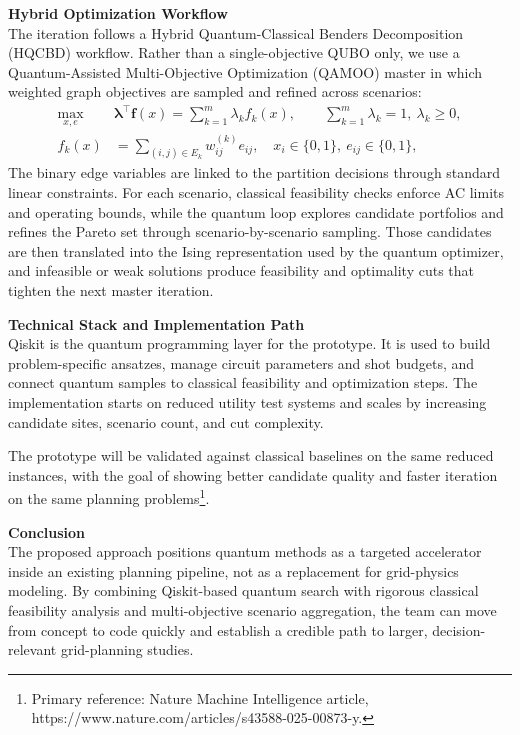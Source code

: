 \documentclass[11pt]{article}
\begin{document}
\noindent\textbf{Hybrid Optimization Workflow}\\
The iteration follows a Hybrid Quantum-Classical Benders Decomposition (HQCBD) workflow. Rather than a single-objective QUBO only, we use a Quantum-Assisted Multi-Objective Optimization (QAMOO) master in which weighted graph objectives are sampled and refined across scenarios:
\begin{align*}
\max_{x,e}\quad & \mathbf{\lambda}^{\top}\mathbf{f}(x) = \sum_{k=1}^{m} \lambda_k f_k(x),
\qquad \sum_{k=1}^{m}\lambda_k = 1,\ \lambda_k\ge 0, \\
f_k(x) &= \sum_{(i,j)\in E_k} w_{ij}^{(k)} e_{ij},
\quad x_i\in\{0,1\},\ e_{ij}\in\{0,1\},
\end{align*}
The binary edge variables are linked to the partition decisions through standard linear constraints. For each scenario, classical feasibility checks enforce AC limits and operating bounds, while the quantum loop explores candidate portfolios and refines the Pareto set through scenario-by-scenario sampling. Those candidates are then translated into the Ising representation used by the quantum optimizer, and infeasible or weak solutions produce feasibility and optimality cuts that tighten the next master iteration.

\noindent\textbf{Technical Stack and Implementation Path}\\
Qiskit is the quantum programming layer for the prototype. It is used to build problem-specific ansatzes, manage circuit parameters and shot budgets, and connect quantum samples to classical feasibility and optimization steps. The implementation starts on reduced utility test systems and scales by increasing candidate sites, scenario count, and cut complexity.

The prototype will be validated against classical baselines on the same reduced instances, with the goal of showing better candidate quality and faster iteration on the same planning problems\footnote{Primary reference: Nature Machine Intelligence article, https://www.nature.com/articles/s43588-025-00873-y.}.

\noindent\textbf{Conclusion}\\
The proposed approach positions quantum methods as a targeted accelerator inside an existing planning pipeline, not as a replacement for grid-physics modeling. By combining Qiskit-based quantum search with rigorous classical feasibility analysis and multi-objective scenario aggregation, the team can move from concept to code quickly and establish a credible path to larger, decision-relevant grid-planning studies.
\end{document}
